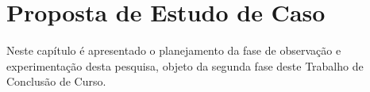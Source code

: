\chapter{Proposta de Estudo de Caso}
\label{ch:proposta}

Neste capítulo é apresentado o planejamento da fase de observação e experimentação  desta pesquisa, objeto da segunda fase deste Trabalho de Conclusão de Curso.











